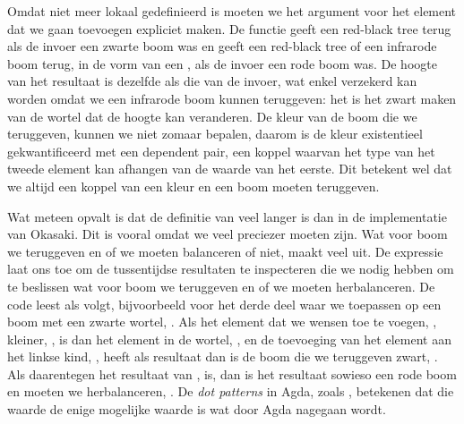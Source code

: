 Omdat  niet meer lokaal gedefinieerd is moeten we het argument voor
het element dat we gaan toevoegen expliciet maken. De functie  geeft
een red-black tree terug als de invoer een zwarte boom was en geeft een
red-black tree of een infrarode boom terug, in de vorm van een ,
als de invoer een rode boom was. De hoogte van het resultaat is dezelfde als
die van de invoer, wat enkel verzekerd kan worden omdat we een infrarode boom
kunnen teruggeven: het is het zwart maken van de wortel dat de hoogte kan
veranderen. De kleur van de boom die we teruggeven, kunnen we niet zomaar
bepalen, daarom is de kleur existentieel gekwantificeerd met een dependent pair,
een koppel waarvan het type van het tweede element kan afhangen van de waarde
van het eerste. Dit betekent wel dat we altijd een koppel van een kleur en een
boom moeten teruggeven.


Wat meteen opvalt is dat de definitie van  veel langer is dan in de
implementatie van Okasaki. Dit is vooral omdat we veel preciezer moeten zijn.
Wat voor boom we teruggeven en of we moeten balanceren of niet, maakt veel uit.
De  expressie laat ons toe om de tussentijdse resultaten te
inspecteren die we nodig hebben om te beslissen wat voor boom we teruggeven en
of we moeten herbalanceren. De code leest als volgt, bijvoorbeeld voor het
derde deel waar we  toepassen op een boom met een zwarte wortel,
. Als het element dat we wensen toe te voegen, ,
kleiner, , is dan het element in de wortel, , en de
toevoeging van het element aan het linkse kind, , heeft als
resultaat  dan is de boom die we teruggeven zwart, . Als daarentegen het resultaat van , 
is, dan is het resultaat sowieso een rode boom en moeten we herbalanceren,
. De \emph{dot patterns} in Agda, zoals
, betekenen dat die waarde de enige mogelijke waarde is wat door Agda
nagegaan wordt.

